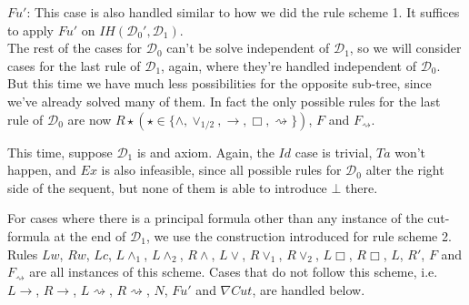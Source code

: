 \documentclass[a4paper, 12pt]{paper}
\begin{document}
 $Fu'$: This case is also handled similar to how we did the rule scheme 1.
 It suffices to apply $Fu'$ on $IH(\mathcal{D}_0', \mathcal{D}_1)$.\\

 The rest of the cases for $\mathcal{D}_0$ can't be solve independent of $\mathcal{D}_1$, so we will consider cases for the last rule of $\mathcal{D}_1$, again, where they're handled independent of $\mathcal{D}_0$.
 But this time we have much less possibilities for the opposite sub-tree, since we've already solved many of them. In fact the only possible rules for the last rule of $\mathcal{D}_0$ are now $R\star (\star \in \{\land, \lor_{1/2}, \rightarrow, \Box, \rightsquigarrow\})$, $F$ and $F_\rightsquigarrow$.

 This time, suppose $\mathcal{D}_1$ is and axiom. Again, the $Id$ case is trivial, $Ta$ won't happen, and $Ex$ is also infeasible, since all possible rules for $\mathcal{D}_0$ alter the right side of the sequent, but none of them is able to introduce $\bot$ there.

 For cases where there is a principal formula other than any instance of the cut-formula at the end of $\mathcal{D}_1$, we use the construction introduced for rule scheme 2. Rules $Lw$, $Rw$, $Lc$, $L\land_1$, $L\land_2$, $R\land$, $L\lor$, $R\lor_1$, $R\lor_2$, $L\Box$, $R\Box$, $L$, $R'$, $F$ and $F_\rightsquigarrow$ are all instances of this scheme. Cases that do not follow this scheme, i.e. $L\rightarrow$, $R\rightarrow$, $L\rightsquigarrow$, $R\rightsquigarrow$, $N$, $Fu'$ and $\nabla Cut$, are handled below.\\
\end{document}
